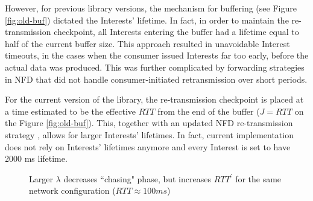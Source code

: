 \documentclass{icn/sig-alternate-2013} %
\begin{document}
However, for previous library versions, the mechanism for buffering (see Figure \ref{fig:old-buf}) dictated the Interests' lifetime. In fact, in order to maintain the re-transmission checkpoint, all Interests entering the buffer had a lifetime equal to half of the current buffer size. This approach resulted in unavoidable Interest timeouts, in the cases when the consumer issued Interests far too early, before the actual data was produced.  This was further complicated by forwarding strategies in NFD that did not handle consumer-initiated retransmission over short periods. 

For the current version of the library, the re-transmission checkpoint is placed at a time estimated to be the effective $RTT$ from the end of the buffer ($J=RTT$ on the Figure \ref{fig:old-buf}). This, together with an updated NFD re-transmission strategy \cite{nfd-rtx-release}, allows for larger Interests' lifetimes. 
In fact, current implementation does not rely on Interests' lifetimes anymore and every Interest is set to have 2000 ms lifetime.


\begin{figure}[t!]
\centering
\begin{scriptsize}
\end{scriptsize}
\caption{Larger $\lambda$ decreases ``chasing" phase, but increases $RTT^\prime$ for the same network configuration ($RTT\approx100ms$)}
\label{fig:ws}
\end{figure}
\end{document}
